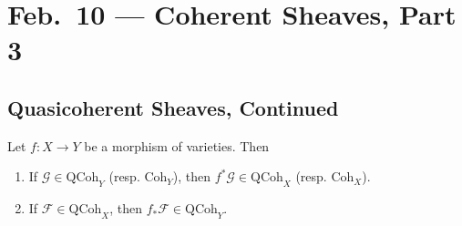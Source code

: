 \chapter{Feb.~10 --- Coherent Sheaves, Part 3}

\section{Quasicoherent Sheaves, Continued}

\begin{prop}\label{prop:pushforward-pullback}
  Let $f : X \to Y$ be a morphism of
  varieties. Then
  \begin{enumerate}
    \item If $\mathcal{G} \in \mathrm{QCoh}_Y$
      (resp. $\mathrm{Coh}_Y$), then $f^* \mathcal{G} \in \mathrm{QCoh}_X$
      (resp. $\mathrm{Coh}_X$).
    \item If $\mathcal{F} \in \mathrm{QCoh}_X$, then $f_* \mathcal{F} \in \mathrm{QCoh}_Y$.
  \end{enumerate}
\end{prop}

